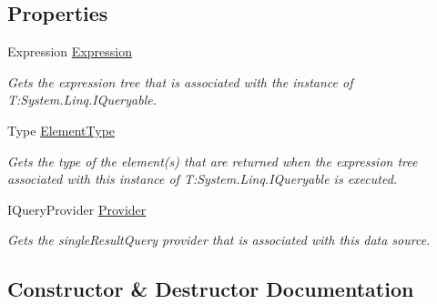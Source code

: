 \subsection*{Properties}
\begin{DoxyCompactItemize}
\item 
Expression \hyperlink{classCqrs_1_1DataStores_1_1InProcessDataStore_a459174c411a0df2b4ec1e48a3b36f884_a459174c411a0df2b4ec1e48a3b36f884}{Expression}
\begin{DoxyCompactList}\small\item\em Gets the expression tree that is associated with the instance of T\+:\+System.\+Linq.\+I\+Queryable. \end{DoxyCompactList}\item 
Type \hyperlink{classCqrs_1_1DataStores_1_1InProcessDataStore_aacc8434efa0250be78dda57e159a5aa8_aacc8434efa0250be78dda57e159a5aa8}{Element\+Type}
\begin{DoxyCompactList}\small\item\em Gets the type of the element(s) that are returned when the expression tree associated with this instance of T\+:\+System.\+Linq.\+I\+Queryable is executed. \end{DoxyCompactList}\item 
I\+Query\+Provider \hyperlink{classCqrs_1_1DataStores_1_1InProcessDataStore_a9f4e487d52f69245266afdf303d585c1_a9f4e487d52f69245266afdf303d585c1}{Provider}
\begin{DoxyCompactList}\small\item\em Gets the single\+Result\+Query provider that is associated with this data source. \end{DoxyCompactList}\end{DoxyCompactItemize}


\subsection{Constructor \& Destructor Documentation}
\mbox{\label{classCqrs_1_1DataStores_1_1InProcessDataStore_a86a0ef4945e0f2fa45027ceb3261d284_a86a0ef4945e0f2fa45027ceb3261d284}} 
